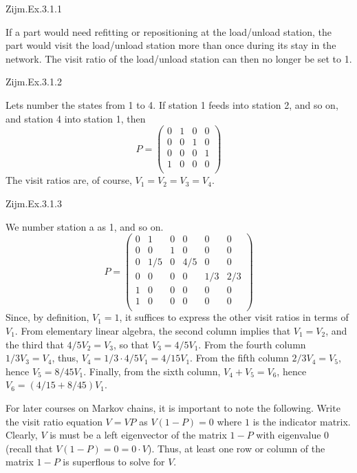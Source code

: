 \begin{question}
Zijm.Ex.3.1.1 
\begin{solution}
If a part would need refitting or repositioning at the load/unload station, the part would visit the load/unload station more than once during its stay in the network. The visit ratio of the load/unload station can then no longer be set to 1.
\end{solution}
\end{question}

\begin{question}
Zijm.Ex.3.1.2
\begin{solution}
Lets number the states from 1 to 4. If station 1 feeds into station 2, and so on, and station 4 into station 1, then 
\begin{equation*}
  P = 
  \begin{pmatrix}
    0 & 1 & 0 & 0\\
    0 & 0 & 1 & 0\\
    0 & 0 & 0 & 1\\
    1 & 0 & 0 & 0\\
  \end{pmatrix}
\end{equation*}
The visit ratios are, of course, $V_1= V_2 = V_3 = V_4$. 
\end{solution}
\end{question}

\begin{question}
Zijm.Ex.3.1.3
\begin{solution}
We number  station a as 1, and so on.
\begin{equation*}
  P = 
  \begin{pmatrix}
    0 & 1 & 0 & 0 & 0 & 0 \\
    0 & 0 & 1 & 0 & 0 & 0 \\
    0 & 1/5 & 0 & 4/5 & 0 & 0\\
    0 & 0& 0 & 0 & 1/3 & 2/3 \\
    1 & 0 & 0 & 0 & 0 & 0\\
    1 & 0 & 0 & 0 & 0 & 0\\
  \end{pmatrix}
\end{equation*}
Since, by definition, $V_1=1$, it suffices to express the other visit
ratios in terms of $V_1$. From elementary linear algebra, the second
column implies that $V_1 = V_2$, and the third that $4/5 V_2 = V_3$,
so that $V_3 = 4/5 V_1$. From the fourth column $1/3 V_3=V_4$, thus,
$V_4 = 1/3 \cdot 4/5 V_1 = 4/15 V_1$.  From the fifth column
$2/3 V_4 = V_5$, hence $V_5 = 8/45 V_1$. Finally, from the sixth
column, $V_4+V_5 = V_6$, hence $V_6 = (4/15 + 8/45)V_1$. 

For later courses on Markov chains, it is important to note the
following. Write the visit ratio equation $V = VP$ as $V(1-P)=0$ where
$1$ is the indicator matrix. Clearly, $V$ is must be a left
eigenvector of the matrix $1-P$ with eigenvalue 0 (recall that
$V(1-P) = 0 = 0\cdot V$). Thus, at least one row or column of the matrix $1-P$ is superflous to solve for $V$. 
\end{solution}
\end{question}

